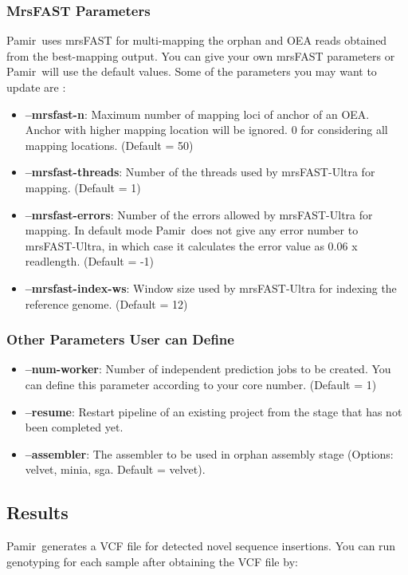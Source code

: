 \documentclass{article}
\newcommand{\toolName}{Pamir~}
\begin{document}
\subsubsection{MrsFAST Parameters}
\toolName uses mrsFAST for multi-mapping the orphan and OEA reads obtained from the best-mapping output. You can give your own mrsFAST parameters or \toolName will use the default values. Some of the parameters you may want to update are :\\
\begin{itemize}
\item\textbf{--mrsfast-n}: Maximum number of mapping loci of anchor of an OEA. Anchor with higher mapping location will be ignored. 0 for considering all mapping locations. 
(Default = 50)
\item\textbf{--mrsfast-threads}: Number of the threads used by mrsFAST-Ultra for mapping. (Default = 1)
\item\textbf{--mrsfast-errors}: Number of the errors allowed by mrsFAST-Ultra for mapping. In default mode \toolName does not give any error number to mrsFAST-Ultra, in which case it calculates the error value as 0.06 x readlength. (Default = -1)
\item\textbf{--mrsfast-index-ws}: Window size used by mrsFAST-Ultra for indexing the reference genome. (Default = 12)
\end{itemize}

\subsubsection{Other Parameters User can Define}
\begin{itemize}
\item\textbf{--num-worker}: Number of independent prediction jobs to be created. You can define this parameter according to your core number. (Default = 1)
\item\textbf{--resume}: Restart pipeline of an existing project from the stage that has not been completed yet.
\item\textbf{--assembler}: The assembler to be used in orphan assembly stage (Options: velvet, minia, sga. Default = velvet).
\end{itemize}


\subsection{Results}
\toolName generates a VCF file for detected novel sequence insertions. You can run genotyping for each sample after obtaining the VCF file by:
\end{document}
